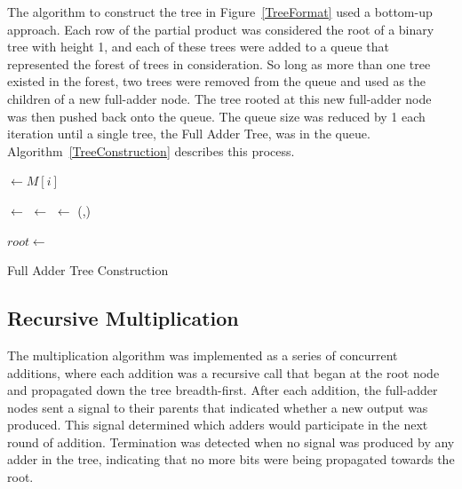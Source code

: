 \documentclass{article}
\begin{document}
The algorithm to construct the tree in Figure~\ref{TreeFormat} used a bottom-up approach. Each row of the partial product was considered the root of a binary tree with height 1, and each of these trees were added to a queue that represented the forest of trees in consideration. So long as more than one tree existed in the forest, two trees were removed from the queue and used as the children of a new full-adder node. The tree rooted at this new full-adder node was then pushed back onto the queue. The queue size was reduced by 1 each iteration until a single tree, the Full Adder Tree, was in the queue. Algorithm~\ref{TreeConstruction} describes this process.

\begin{algorithm}[h]
		
	
	\BlankLine
	{
		\Source $\leftarrow M[i]$\;
		\Push{\Queue,\Source}\;
	}
	\BlankLine
	
	{
		\LeftChild $\leftarrow$ \Front{\Queue}\;
		\Pop{\Queue}\;
		\BlankLine
		\RightChild $\leftarrow$ \Front{\Queue}\;
		\Pop{\Queue}\;
		\BlankLine
		\Adder $\leftarrow$ (\LeftChild,\RightChild)\;
		\Push{\Queue,\Adder}\;
	}
	\BlankLine
	
	$root \leftarrow$ \Front{\Queue}\;
	\caption{Full Adder Tree Construction}
	\label{TreeConstruction}
\end{algorithm}

\subsection{Recursive Multiplication}
The multiplication algorithm was implemented as a series of concurrent additions, where each addition was a recursive call that began at the root node and propagated down the tree breadth-first. After each addition, the full-adder nodes sent a signal to their parents that indicated whether a new output was produced. This signal determined which adders would participate in the next round of addition. Termination was detected when no signal was produced by any adder in the tree, indicating that no more bits were being propagated towards the root.
\end{document}
